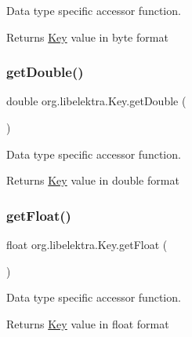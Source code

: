 Data type specific accessor function. 

\begin{DoxyReturn}{Returns}
\hyperlink{classorg_1_1libelektra_1_1Key}{Key} value in byte format 
\end{DoxyReturn}
\mbox{\label{classorg_1_1libelektra_1_1Key_a64f1c2bc6776b8f08d8e50554713d07a}} 
\subsubsection{\texorpdfstring{get\+Double()}{getDouble()}}
{\footnotesize\ttfamily double org.\+libelektra.\+Key.\+get\+Double (\begin{DoxyParamCaption}{ }\end{DoxyParamCaption})\hspace{0.3cm}{\ttfamily [inline]}}



Data type specific accessor function. 

\begin{DoxyReturn}{Returns}
\hyperlink{classorg_1_1libelektra_1_1Key}{Key} value in double format 
\end{DoxyReturn}
\mbox{\label{classorg_1_1libelektra_1_1Key_a24351f3c1faf4f7d69c7761aa60e69f1}} 
\subsubsection{\texorpdfstring{get\+Float()}{getFloat()}}
{\footnotesize\ttfamily float org.\+libelektra.\+Key.\+get\+Float (\begin{DoxyParamCaption}{ }\end{DoxyParamCaption})\hspace{0.3cm}{\ttfamily [inline]}}



Data type specific accessor function. 

\begin{DoxyReturn}{Returns}
\hyperlink{classorg_1_1libelektra_1_1Key}{Key} value in float format 
\end{DoxyReturn}
\mbox{\label{classorg_1_1libelektra_1_1Key_a1dfefbb75e54fd1bff57d626954fb4fc}} 
